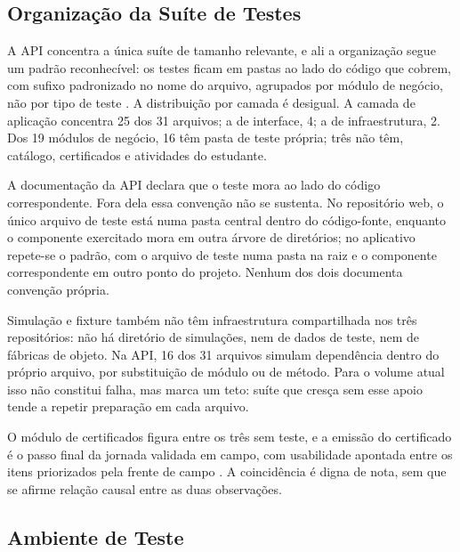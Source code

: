 
\subsection{Organização da Suíte de Testes}

A API concentra a única suíte de tamanho relevante, e ali a organização segue um
padrão reconhecível: os testes ficam em pastas ao lado do código que cobrem, com
sufixo padronizado no nome do arquivo, agrupados por módulo de negócio, não por
tipo de teste \cite{educado-repos}. A distribuição por camada é desigual. A
camada de aplicação concentra 25 dos 31 arquivos; a de interface, 4; a de
infraestrutura, 2. Dos 19 módulos de negócio, 16 têm pasta de teste própria; três
não têm, catálogo, certificados e atividades do estudante.

A documentação da API declara que o teste mora ao lado do código correspondente.
Fora dela essa convenção não se sustenta. No repositório web, o único arquivo de
teste está numa pasta central dentro do código-fonte, enquanto o componente
exercitado mora em outra árvore de diretórios; no aplicativo repete-se o padrão,
com o arquivo de teste numa pasta na raiz e o componente correspondente em outro
ponto do projeto. Nenhum dos dois documenta convenção própria.

Simulação e fixture também não têm infraestrutura compartilhada nos três
repositórios: não há diretório de simulações, nem de dados de teste, nem de
fábricas de objeto. Na API, 16 dos 31 arquivos simulam dependência dentro do próprio arquivo, por substituição de módulo ou de método. Para o
volume atual isso não constitui falha, mas marca um teto: suíte que cresça sem
esse apoio tende a repetir preparação em cada arquivo.

O módulo de certificados figura entre os três sem teste, e a emissão do
certificado é o passo final da jornada validada em campo, com usabilidade
apontada entre os itens priorizados pela frente de campo \cite[p.~28]{psp5}. A
coincidência é digna de nota, sem que se afirme relação causal entre as duas
observações.


\subsection{Ambiente de Teste}

